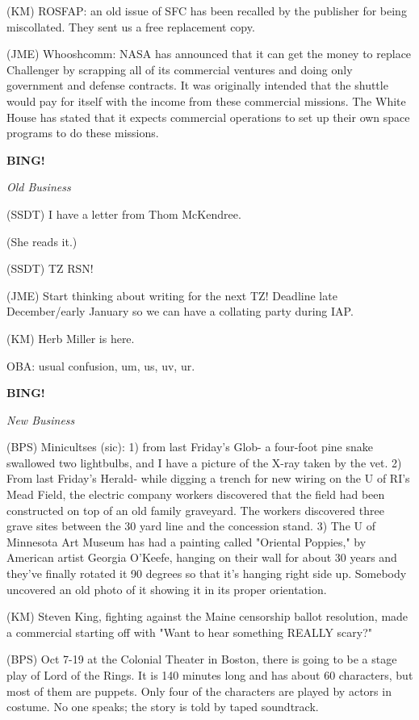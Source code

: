 \documentclass[12pt]{article}
\newcommand{\bing}{{\bf BING!} }
\newcommand{\goto}[1]{\bing \vskip 12pt \centerline{{\em{#1}}}}
\begin{document}
(KM) ROSFAP: an old issue of SFC has been recalled by the publisher for being miscollated. They sent us a free replacement copy.

(JME) Whooshcomm: NASA has announced that it can get the money to replace Challenger by scrapping all of its commercial ventures and doing only government and defense contracts. It was originally intended that the shuttle would pay for itself with the income from these commercial missions. The White House has stated that it expects commercial operations to set up their own space programs to do these missions.

\goto{Old Business}

(SSDT) I have a letter from Thom McKendree.

(She reads it.)

(SSDT) TZ RSN!

(JME) Start thinking about writing for the next TZ! Deadline late December/early January so we can have a collating party during IAP.

(KM) Herb Miller is here.

OBA: usual confusion, um, us, uv, ur.

\goto{New Business}

(BPS) Minicultses (sic): 1) from last Friday's Glob- a four-foot pine snake swallowed two lightbulbs, and I have a picture of the X-ray taken by the vet. 2) From last Friday's Herald- while digging a trench for new wiring on the U of RI's Mead Field, the electric company workers discovered that the field had been constructed on top of an old family graveyard. The workers discovered three grave sites between the 30 yard line and the concession stand. 3) The U of Minnesota Art Museum has had a painting called "Oriental Poppies," by American artist Georgia O'Keefe, hanging on their wall for about 30 years and they've finally rotated it 90 degrees so that it's hanging right side up. Somebody uncovered an old photo of it showing it in its proper orientation.

(KM) Steven King, fighting against the Maine censorship ballot resolution, made a commercial starting off with "Want to hear something REALLY scary?"

(BPS) Oct 7-19 at the Colonial Theater in Boston, there is going to be a stage play of Lord of the Rings. It is 140 minutes long and has about 60 characters, but most of them are puppets. Only four of the characters are played by actors in costume. No one speaks; the story is told by taped soundtrack.
\end{document}
